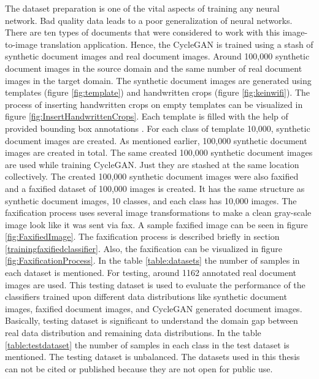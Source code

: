 The dataset preparation is one of the vital aspects of training any neural network. Bad quality data leads to a poor generalization of neural networks. There are ten types of documents that were considered to work with this image-to-image translation application. Hence, the \ac{CycleGAN} is trained using a stash of synthetic document images and real document images. Around 100,000 synthetic document images in the source domain and the same number of real document images in the target domain. The synthetic document images are generated using templates (figure \ref{fig:template}) and handwritten crops (figure \ref{fig:keinwifi}). The process of inserting handwritten crops on empty templates can be visualized in figure \ref{fig:InsertHandwrittenCrops}. Each template is filled with the help of provided bounding box annotations \cite{lin2015microsoft}. For each class of template 10,000, synthetic document images are created. As mentioned earlier, 100,000 synthetic document images are created in total. The same created 100,000 synthetic document images are used while training \ac{CycleGAN}. Just they are stashed at the same location collectively. The created 100,000 synthetic document images were also faxified and a faxified dataset of 100,000 images is created. It has the same structure as synthetic document images, 10 classes, and each class has 10,000 images. The faxification process uses several image transformations to make a clean gray-scale image look like it was sent via fax. A sample faxified image can be seen in figure \ref{fig:FaxifiedImage}. The faxification process is described briefly in section \ref{trainingfaxifiedclassifier}. Also, the faxification can be visualized in figure \ref{fig:FaxificationProcess}. In the table \ref{table:datasets} the number of samples in each dataset is mentioned. For testing, around 1162 annotated real document images are used. This testing dataset is used to evaluate the performance of the classifiers trained upon different data distributions like synthetic document images, faxified document images, and \ac{CycleGAN} generated document images. Basically, testing dataset is significant to understand the domain gap between real data distribution and remaining data distributions. In the table \ref{table:testdataset} the number of samples in each class in the test dataset is mentioned. The testing dataset is unbalanced. The datasets used in this thesis can not be cited or published because they are not open for public use.


